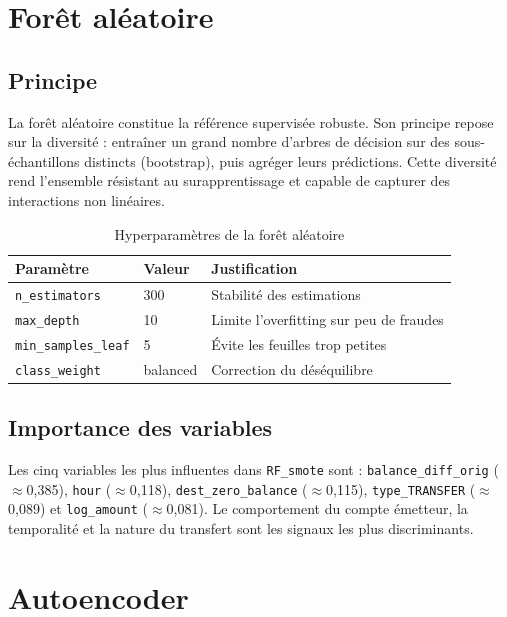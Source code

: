 \documentclass[12pt,a4paper,twoside]{report}
\begin{document}
\section{Forêt aléatoire}

\subsection{Principe}

La forêt aléatoire constitue la référence supervisée robuste. Son principe repose sur la diversité : entraîner un grand nombre d'arbres de décision sur des sous-échantillons distincts (bootstrap), puis agréger leurs prédictions. Cette diversité rend l'ensemble résistant au surapprentissage et capable de capturer des interactions non linéaires.

\begin{table}[H]
\centering
\caption{Hyperparamètres de la forêt aléatoire}
\label{tab:rf_params}
\begin{tabular}{lll}
\toprule
\textbf{Paramètre}          & \textbf{Valeur} & \textbf{Justification} \\
\midrule
\texttt{n\_estimators}      & 300             & Stabilité des estimations \\
\texttt{max\_depth}         & 10              & Limite l'overfitting sur peu de fraudes \\
\texttt{min\_samples\_leaf} & 5               & Évite les feuilles trop petites \\
\texttt{class\_weight}      & balanced        & Correction du déséquilibre \\
\bottomrule
\end{tabular}
\end{table}

\subsection{Importance des variables}

Les cinq variables les plus influentes dans \texttt{RF\_smote} sont : \texttt{balance\_diff\_orig} ($\approx$0,385), \texttt{hour} ($\approx$0,118), \texttt{dest\_zero\_balance} ($\approx$0,115), \texttt{type\_TRANSFER} ($\approx$0,089) et \texttt{log\_amount} ($\approx$0,081). Le comportement du compte émetteur, la temporalité et la nature du transfert sont les signaux les plus discriminants.

\section{Autoencoder}
\end{document}
